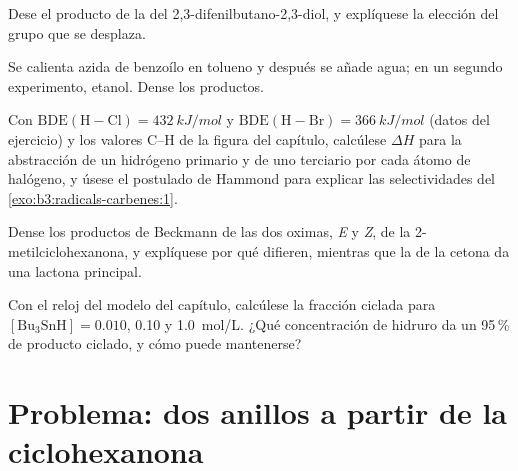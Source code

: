 \begin{exercise}[$\star\star$]\label{exo:b3:radicals-carbenes:8}
Dese el producto de la  del 2,3-difenilbutano-2,3-diol,
y explíquese la elección del grupo que se desplaza.
\end{exercise}

\begin{exercise}[$\star\star$]\label{exo:b3:radicals-carbenes:9}
Se calienta azida de benzoílo en tolueno y después se añade agua; en un segundo experimento,
etanol. Dense los productos.
\end{exercise}

\begin{exercise}[$\star\star\star$]\label{exo:b3:radicals-carbenes:10}
Con $\mathrm{BDE(H{-}Cl)} = \qty{432}{kJ/mol}$ y $\mathrm{BDE(H{-}Br)} = \qty{366}{kJ/mol}$ (datos del ejercicio) y los valores C--H de
la figura del capítulo, calcúlese $\Delta H$ para la abstracción de un hidrógeno primario y de uno terciario
por cada átomo de halógeno, y úsese el postulado de Hammond para explicar las
selectividades del \cref{exo:b3:radicals-carbenes:1}.
\end{exercise}

\begin{exercise}[$\star\star\star$]\label{exo:b3:radicals-carbenes:11}
Dense los productos de Beckmann de las dos oximas, \textit{E} y \textit{Z}, de la 2-metilciclohexanona,
y explíquese por qué difieren, mientras que la  de la
cetona da una lactona principal.
\end{exercise}

\begin{exercise}[$\star\star\star$]\label{exo:b3:radicals-carbenes:12}
Con el reloj del modelo del capítulo, calcúlese la fracción ciclada para $[\mathrm{Bu_3SnH}] = 0.010$,
0.10 y \qty{1.0}{mol/L}. ¿Qué concentración de hidruro da un 95\,\% de producto ciclado, y cómo
puede mantenerse?
\end{exercise}

\section{Problema: dos anillos a partir de la ciclohexanona}

